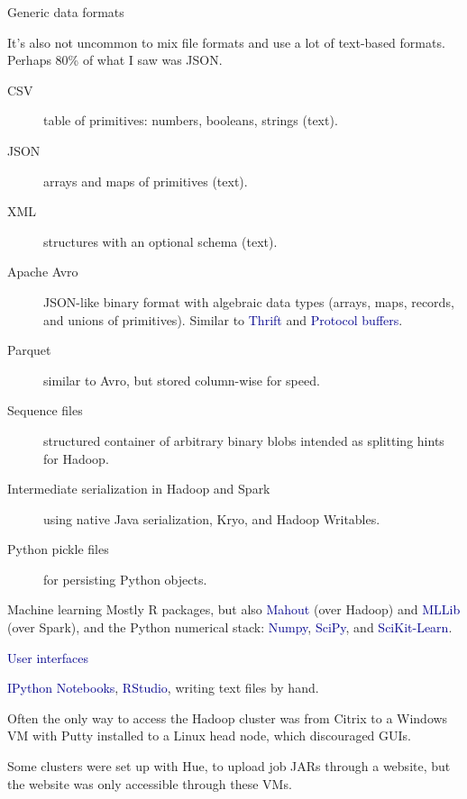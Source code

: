 \documentclass{beamer}
\begin{document}
\begin{frame}{Generic data formats}

It's also not uncommon to mix file formats and use a lot of text-based formats. Perhaps 80\% of what I saw was JSON.

\begin{description}
\item[CSV] table of primitives: numbers, booleans, strings (text).
\item[JSON] arrays and maps of primitives (text).
\item[XML] structures with an optional schema (text).
\item[Apache Avro] JSON-like binary format with algebraic data types (arrays, maps, records, and unions of primitives). Similar to \textcolor{darkblue}{Thrift} and \textcolor{darkblue}{Protocol buffers}.
\item[Parquet] similar to Avro, but stored column-wise for speed.
\item[Sequence files] structured container of arbitrary binary blobs intended as splitting hints for Hadoop.
\item[Intermediate serialization in Hadoop and Spark] using native Java serialization, Kryo, and Hadoop Writables.
\item[Python pickle files] for persisting Python objects.
\end{description}
\end{frame}

\begin{frame}{Machine learning}
Mostly R packages, but also \textcolor{darkblue}{Mahout} (over Hadoop) and \textcolor{darkblue}{MLLib} (over Spark), and the Python numerical stack: \textcolor{darkblue}{Numpy}, \textcolor{darkblue}{SciPy}, and \textcolor{darkblue}{SciKit-Learn}.

\vfill
\hspace{-0.83 cm} \textcolor{darkblue}{\Large User interfaces}

\vspace{0.5 cm}
\textcolor{darkblue}{IPython Notebooks}, \textcolor{darkblue}{RStudio}, writing text files by hand.

\vspace{0.5 cm}
Often the only way to access the Hadoop cluster was from Citrix to a Windows VM with Putty installed to a Linux head node, which discouraged GUIs.

\vspace{0.5 cm}
Some clusters were set up with Hue, to upload job JARs through a website, but the website was only accessible through these VMs.
\end{frame}
\end{document}
